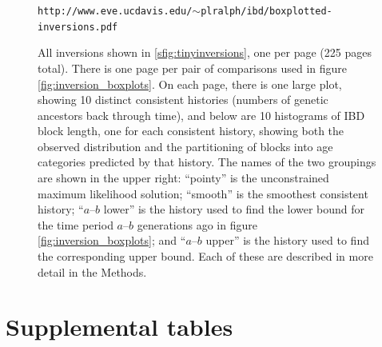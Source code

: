 \documentclass{article}
\begin{document}
\begin{figure}[!htp]
  \begin{center}
    
    \vspace{2em}
    \begin{center}
      {\tt http://www.eve.ucdavis.edu/$\sim$plralph/ibd/boxplotted-inversions.pdf }
    \end{center}
    \vspace{2em}
    \caption{
    All inversions shown in \ref{sfig:tinyinversions}, one per page (225 pages total).
    There is one page per pair of comparisons used in figure \ref{fig:inversion_boxplots}.
    On each page, there is one large plot, showing 10 distinct consistent histories (numbers of genetic ancestors back through time),
    and below are 10 histograms of IBD block length, one for each consistent history,
    showing both the observed distribution
    and the partitioning of blocks into age categories predicted by that history.
    The names of the two groupings are shown in the upper right:
    ``pointy'' is the unconstrained maximum likelihood solution;
    ``smooth'' is the smoothest consistent history;
    ``$a$--$b$ lower'' is the history used to find the lower bound for the time period $a$--$b$ generations ago in figure \ref{fig:inversion_boxplots};
    and ``$a$--$b$ upper'' is the history used to find the corresponding upper bound.
    Each of these are described in more detail in the Methods.
    \label{sfig:all_inversions}
    }
  \end{center}
\end{figure}

\clearpage

\section*{Supplemental tables}
\end{document}

